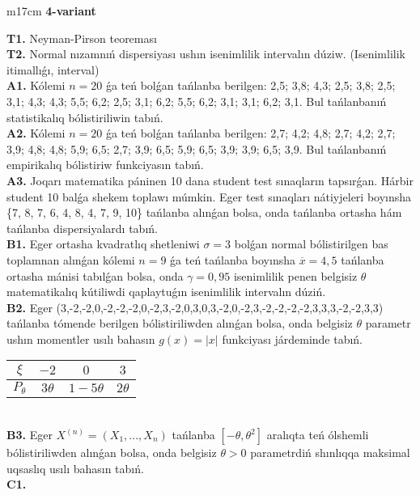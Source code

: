 \documentclass{article}
\begin{document}
\begin{tabular}{m{17cm}}
\textbf{4-variant}
\newline

\textbf{T1.} 
Neyman-Pirson teoreması
 \\
\textbf{T2.} 
Normal nızamnıń dispersiyası ushın isenimlilik intervalın dúziw. (Isenimlilik itimallıǵı, interval)
 \\
\textbf{A1.} 
Kólemi \(n = 20\) ǵa teń bolǵan tańlanba berilgen: 2,5; 3,8; 4,3; 2,5; 3,8; 2,5; 3,1; 4,3; 4,3; 5,5; 6,2; 2,5; 3,1; 6,2; 5,5; 6,2; 3,1; 3,1; 6,2; 3,1. Bul tańlanbanıń statistikalıq bólistiriliwin tabıń.
 \\
\textbf{A2.} 
Kólemi \(n = 20\) ǵa teń bolǵan tańlanba berilgen: 2,7; 4,2; 4,8; 2,7; 4,2; 2,7; 3,9; 4,8; 4,8; 5,9; 6,5; 2,7; 3,9; 6,5; 5,9; 6,5; 3,9; 3,9; 6,5; 3,9. Bul tańlanbanıń empirikalıq bólistiriw funkciyasın tabıń.
 \\
\textbf{A3.} 
Joqarı matematika páninen 10 dana student test sınaqların tapsırǵan. Hárbir student 10 balǵa shekem toplawı múmkin. Eger test sınaqları nátiyjeleri boyınsha \{7, 8, 7, 6, 4, 8, 4, 7, 9, 10\} tańlanba alınǵan bolsa, onda tańlanba ortasha hám tańlanba dispersiyalardı tabıń.
 \\
\textbf{B1.} 
Eger ortasha kvadratlıq shetleniwi \(\sigma = 3\) bolǵan normal bólistirilgen bas toplamnan alınǵan kólemi \(n = 9\) ǵa teń tańlanba boyınsha \(\overline{x} = 4,5\) tańlanba ortasha mánisi tabılǵan bolsa, onda \(\gamma = 0,95\) isenimlilik penen belgisiz \(\theta\) matematikalıq kútiliwdi qaplaytuǵın isenimlilik intervalın dúziń.
 \\
\textbf{B2.} 
Eger (3,-2,-2,0,-2,-2,-2,0,-2,3,-2,0,3,0,3,-2,0,-2,3,-2,-2,-2,-2,3,3,3,-2,-2,3,3) tańlanba tómende berilgen bólistiriliwden alınǵan bolsa, onda belgisiz \(\theta\) parametr ushın momentler usılı bahasın \(g(x) = |x|\) funkciyası járdeminde tabıń.
\begin{tabular}{|c|c|c|c|}
  \hline
$\xi$ &
$- 2$ &
$0$ &
$3$ \\
\hline
\(P_{\theta}\) & \(3\theta\) & \(1 - 5\theta\) & \(2\theta\) \\
\hline
\end{tabular}
 \\
\textbf{B3.} 
Eger \(X^{(n)} = \left( X_{1},...,X_{n} \right)\) tańlanba \(\left\lbrack - \theta,\theta^{2} \right\rbrack\) aralıqta teń ólshemli bólistiriliwden alınǵan bolsa, onda belgisiz \(\theta > 0\) parametrdiń shınlıqqa maksimal uqsaslıq usılı bahasın tabıń.
 \\
\textbf{C1.} 

\end{tabular}
\end{document}
